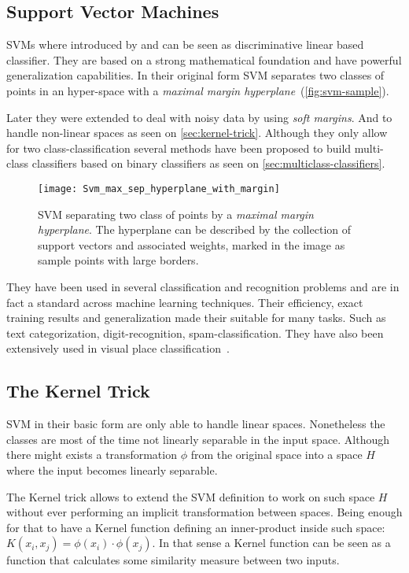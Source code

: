 \subsection{Support Vector Machines}
\Glspl{SVM} where introduced by \cite{cortes1995support} and can be seen as discriminative linear based classifier.
They are based on a strong mathematical foundation and have powerful generalization capabilities.
In their original form \gls{SVM} separates two classes of points in an hyper-space with a \emph{maximal margin hyperplane}~(\autoref{fig:svm-sample}).

Later they were extended to deal with noisy data by using \emph{soft margins}.
And to handle non-linear spaces as seen on \autoref{sec:kernel-trick}.
Although they only allow for two class-classification several methods have been proposed to build multi-class classifiers based on binary classifiers as seen on \autoref{sec:multiclass-classifiers}.

\begin{figure}[h]
\begin{center}
\texttt{[image: Svm\_max\_sep\_hyperplane\_with\_margin]}
\end{center}
\caption{{SVM} separating two class of points by a \emph{maximal margin hyperplane}. The hyperplane can be described by the collection of support vectors and associated weights, marked in the image as sample points with large borders.}
\label{fig:svm-sample}
\end{figure}

They have been used in several classification and recognition problems and are in fact a standard across machine learning techniques.
Their efficiency, exact training results and generalization made their suitable for many tasks. Such as text categorization, digit-recognition, spam-classification.
They have also been extensively used in visual place classification~\citep{pronobis2005msc}.

\subsection{The Kernel Trick}
\label{sec:kernel-trick}
\gls{SVM} in their basic form are only able to handle linear spaces.
Nonetheless the classes are most of the time not linearly separable in the input space.
Although there might exists a transformation $\phi$ from the original space into a space $H$ where the input becomes linearly separable.

The Kernel trick allows to extend the \gls{SVM} definition to work on such space $H$ without ever performing an implicit transformation between spaces.
Being enough for that to have a Kernel function defining an inner-product inside such space: $K(x_i, x_j) = \phi(x_i)\cdot\phi(x_j)$.
In that sense a Kernel function can be seen as a function that calculates some similarity measure between two inputs.

